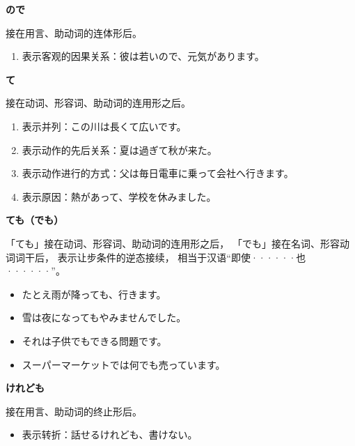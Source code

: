 {\bf
\noindent ので
}

接在用言、助动词的连体形后。
\begin{enumerate}
  \item 表示客观的因果关系：彼は若いので、元気があります。
\end{enumerate}

{\bf
\noindent て
}

接在动词、形容词、助动词的连用形之后。
\begin{enumerate}
  \item 表示并列：この川は長くて広いです。
  \item 表示动作的先后关系：夏は過ぎて秋が来た。
  \item 表示动作进行的方式：父は毎日電車に乗って会社へ行きます。
  \item 表示原因：熱があって、学校を休みました。
\end{enumerate}

{\bf
\noindent ても（でも）
}

「ても」接在动词、形容词、助动词的连用形之后，
「でも」接在名词、形容动词词干后，
表示让步条件的逆态接续，
相当于汉语``即使······也······''。
\begin{itemize}
  \item たとえ雨が降っても、行きます。
  \item 雪は夜になってもやみませんでした。
  \item それは子供でもできる問題です。
  \item スーパーマーケットでは何でも売っています。
\end{itemize}


{\bf
\noindent けれども
}

接在用言、助动词的终止形后。
\begin{itemize}
  \item 表示转折：話せるけれども、書けない。
\end{itemize}
